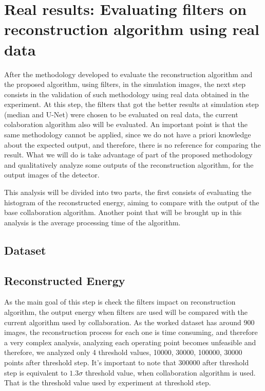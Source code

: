 \documentclass[
        oneside,      %
        english,			
        brazil			 
        ]{abntbibufjf}
\begin{document}
\section{Real results: Evaluating filters on reconstruction algorithm using real data}

After the methodology developed to evaluate the reconstruction algorithm and the proposed algorithm, using filters, in the simulation images, the next step consists in the validation of such methodology using real data obtained in the experiment. At this step, the filters that got the better results at simulation step (median and U-Net) were chosen to be evaluated on real data, the current colaboration algorithm also will be evaluated. An important point is that the same methodology cannot be applied, since we do not have a priori knowledge about the expected output, and therefore, there is no reference for comparing the result. What we will do is take advantage of part of the proposed methodology and qualitatively analyze some outputs of the reconstruction algorithm, for the output images of the detector.

This analysis will be divided into two parts, the first consists of evaluating the histogram of the reconstructed energy, aiming to compare with the output of the base collaboration algorithm. Another point that will be brought up in this analysis is the average processing time of the algorithm.

\subsection{Dataset}


\subsection{Reconstructed Energy}

As the main goal of this step is check the filters impact on reconstruction algorithm, the output energy when filters are used will be compared with the current algorithm used by collaboration. As the worked dataset has around 900 images, the reconstruction process for each one is time consuming, and therefore a very complex analysis, analyzing each operating point becomes unfeasible and therefore, we analyzed only 4 threshold values, 10000, 30000, 100000, 30000 points after threshold step. It's important to note that 300000 after threshold step is equivalent to $1.3\sigma$ threshold value, when collaboration algorithm is used. That is the threshold value used by experiment at threshold step.
\end{document}
